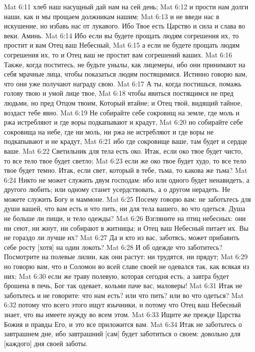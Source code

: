 Mat 6:11  хлеб наш насущный дай нам на сей день;
Mat 6:12  и прости нам долги наши, как и мы прощаем должникам нашим;
Mat 6:13  и не введи нас в искушение, но избавь нас от лукавого. Ибо Твое есть Царство и сила и слава во веки. Аминь.
Mat 6:14  Ибо если вы будете прощать людям согрешения их, то простит и вам Отец ваш Небесный,
Mat 6:15  а если не будете прощать людям согрешения их, то и Отец ваш не простит вам согрешений ваших.
Mat 6:16  Также, когда поститесь, не будьте унылы, как лицемеры, ибо они принимают на себя мрачные лица, чтобы показаться людям постящимися. Истинно говорю вам, что они уже получают награду свою.
Mat 6:17  А ты, когда постишься, помажь голову твою и умой лице твое,
Mat 6:18  чтобы явиться постящимся не пред людьми, но пред Отцом твоим, Который втайне; и Отец твой, видящий тайное, воздаст тебе явно.
Mat 6:19  Не собирайте себе сокровищ на земле, где моль и ржа истребляют и где воры подкапывают и крадут,
Mat 6:20  но собирайте себе сокровища на небе, где ни моль, ни ржа не истребляют и где воры не подкапывают и не крадут,
Mat 6:21  ибо где сокровище ваше, там будет и сердце ваше.
Mat 6:22  Светильник для тела есть око. Итак, если око твое будет чисто, то все тело твое будет светло;
Mat 6:23  если же око твое будет худо, то все тело твое будет темно. Итак, если свет, который в тебе, тьма, то какова же тьма?
Mat 6:24  Никто не может служить двум господам: ибо или одного будет ненавидеть, а другого любить; или одному станет усердствовать, а о другом нерадеть. Не можете служить Богу и маммоне.
Mat 6:25  Посему говорю вам: не заботьтесь для души вашей, что вам есть и что пить, ни для тела вашего, во что одеться. Душа не больше ли пищи, и тело одежды?
Mat 6:26  Взгляните на птиц небесных: они ни сеют, ни жнут, ни собирают в житницы; и Отец ваш Небесный питает их. Вы не гораздо ли лучше их?
Mat 6:27  Да и кто из вас, заботясь, может прибавить себе росту [хотя] на один локоть?
Mat 6:28  И об одежде что заботитесь? Посмотрите на полевые лилии, как они растут: ни трудятся, ни прядут;
Mat 6:29  но говорю вам, что и Соломон во всей славе своей не одевался так, как всякая из них;
Mat 6:30  если же траву полевую, которая сегодня есть, а завтра будет брошена в печь, Бог так одевает, кольми паче вас, маловеры!
Mat 6:31  Итак не заботьтесь и не говорите: что нам есть? или что пить? или во что одеться?
Mat 6:32  потому что всего этого ищут язычники, и потому что Отец ваш Небесный знает, что вы имеете нужду во всем этом.
Mat 6:33  Ищите же прежде Царства Божия и правды Его, и это все приложится вам.
Mat 6:34  Итак не заботьтесь о завтрашнем дне, ибо завтрашний [сам] будет заботиться о своем: довольно для [каждого] дня своей заботы.
